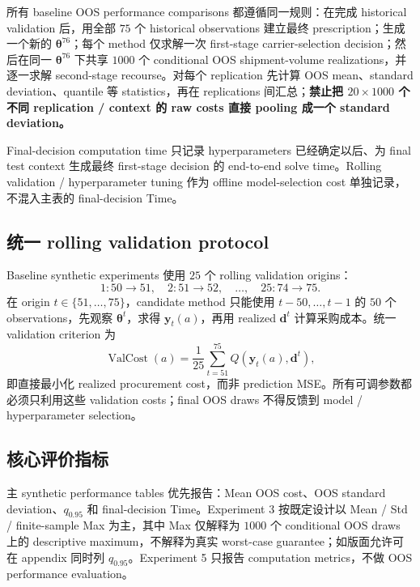\documentclass[11pt,a4paper]{ctexart}
\begin{document}
所有 baseline OOS performance comparisons 都遵循同一规则：在完成 historical validation 后，用全部 $75$ 个 historical observations 建立最终 prescription；生成一个新的 $\boldsymbol\theta^{76}$；每个 method 仅求解一次 first-stage carrier-selection decision；然后在同一 $\boldsymbol\theta^{76}$ 下共享 $1000$ 个 conditional OOS shipment-volume realizations，并逐一求解 second-stage recourse。对每个 replication 先计算 OOS mean、standard deviation、quantile 等 statistics，再在 replications 间汇总；\textbf{禁止把 $20\times1000$ 个不同 replication / context 的 raw costs 直接 pooling 成一个 standard deviation。}

Final-decision computation time 只记录 hyperparameters 已经确定以后、为 final test context 生成最终 first-stage decision 的 end-to-end solve time。Rolling validation / hyperparameter tuning 作为 offline model-selection cost 单独记录，不混入主表的 final-decision Time。

\subsection{统一 rolling validation protocol}

Baseline synthetic experiments 使用 $25$ 个 rolling validation origins：
\[
1{:}50\rightarrow51,\quad 2{:}51\rightarrow52,\quad \ldots,\quad 25{:}74\rightarrow75.
\]
在 origin $t\in\{51,\ldots,75\}$，candidate method 只能使用 $t-50,\ldots,t-1$ 的 $50$ 个 observations，先观察 $\boldsymbol\theta^t$，求得 $\boldsymbol y_t(a)$，再用 realized $\boldsymbol d^t$ 计算采购成本。统一 validation criterion 为
\[
\operatorname{ValCost}(a)
=\frac{1}{25}\sum_{t=51}^{75}Q\!\left(\boldsymbol y_t(a),\boldsymbol d^t\right),
\]
即直接最小化 realized procurement cost，而非 prediction MSE。所有可调参数都必须只利用这些 validation costs；final OOS draws 不得反馈到 model / hyperparameter selection。

\subsection{核心评价指标}

主 synthetic performance tables 优先报告：Mean OOS cost、OOS standard deviation、$q_{0.95}$ 和 final-decision Time。Experiment 3 按既定设计以 Mean / Std / finite-sample Max 为主，其中 Max 仅解释为 $1000$ 个 conditional OOS draws 上的 descriptive maximum，不解释为真实 worst-case guarantee；如版面允许可在 appendix 同时列 $q_{0.95}$。Experiment 5 只报告 computation metrics，不做 OOS performance evaluation。
\end{document}
